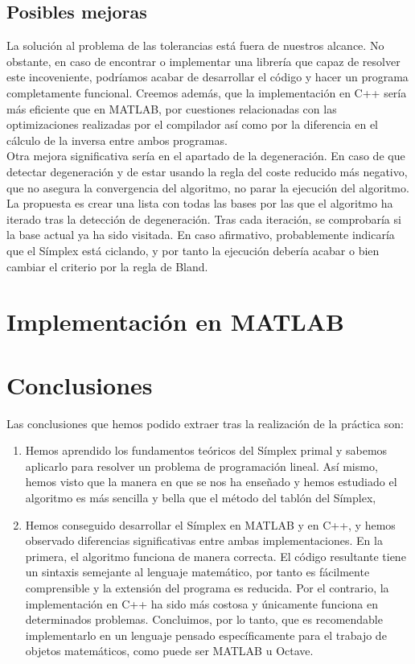 \documentclass[12pt, titlepage]{article}
\begin{document}
\subsection{Posibles mejoras}
La solución al problema de las tolerancias está fuera de nuestros alcance. No obstante, en caso de encontrar o implementar una librería que capaz de resolver este incoveniente, podríamos acabar de desarrollar el código y hacer un programa completamente funcional. Creemos además, que la implementación en C++ sería más eficiente que en MATLAB, por cuestiones relacionadas con las optimizaciones realizadas por el compilador así como por la diferencia en el cálculo de la inversa entre ambos programas.\\
Otra mejora significativa sería en el apartado de la degeneración. En caso de que detectar degeneración y de estar usando la regla del coste reducido más negativo, que no asegura la convergencia del algoritmo, no parar la ejecución del algoritmo. La propuesta es crear una lista con todas las bases por las que el algoritmo ha iterado tras la detección de degeneración. Tras cada iteración, se comprobaría si la base actual ya ha sido visitada. En caso afirmativo, probablemente indicaría que el Símplex está ciclando, y por tanto la ejecución debería acabar o bien cambiar el criterio por la regla de Bland.




\section{Implementación en MATLAB}

\section{Conclusiones}
Las conclusiones que hemos podido extraer tras la realización de la práctica son:
\begin{enumerate}
\item	Hemos aprendido los fundamentos teóricos del Símplex primal y sabemos aplicarlo para resolver un problema de programación lineal. Así mismo, hemos visto que la manera en que se nos ha enseñado y hemos estudiado el algoritmo es más sencilla y bella que el método del tablón del Símplex, 
\item	Hemos conseguido desarrollar el Símplex en MATLAB y en C++, y hemos observado diferencias significativas entre ambas implementaciones. En la primera, el algoritmo funciona de manera correcta. El código resultante tiene un sintaxis semejante al lenguaje matemático, por tanto es fácilmente comprensible y la extensión del programa es reducida. Por el contrario, la implementación en C++ ha sido más costosa y únicamente funciona en determinados problemas. Concluimos, por lo tanto, que es recomendable implementarlo en un lenguaje pensado específicamente para el trabajo de objetos matemáticos, como puede ser MATLAB u Octave.
\end{enumerate}
\end{document}
